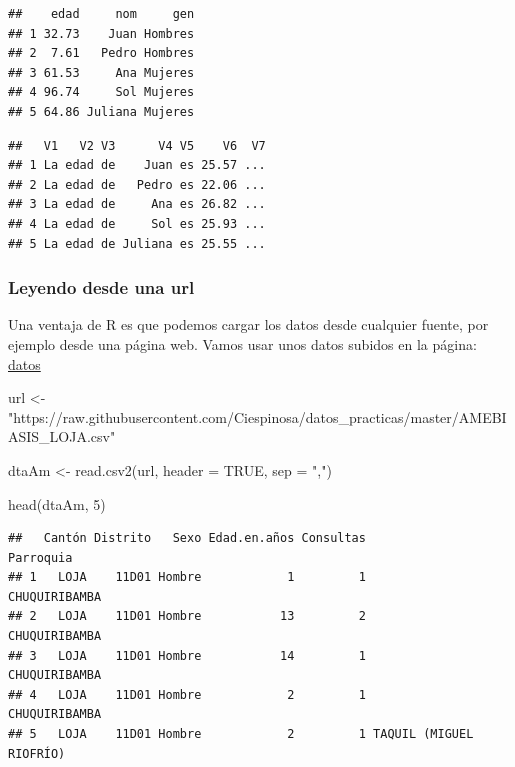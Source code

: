 \documentclass[
]{article}
\newenvironment{Shaded}{\begin{snugshade}}{\end{snugshade}}
\newcommand{\AttributeTok}[1]{\textcolor[rgb]{0.77,0.63,0.00}{#1}}
\newcommand{\ConstantTok}[1]{\textcolor[rgb]{0.00,0.00,0.00}{#1}}
\newcommand{\DecValTok}[1]{\textcolor[rgb]{0.00,0.00,0.81}{#1}}
\newcommand{\FunctionTok}[1]{\textcolor[rgb]{0.00,0.00,0.00}{#1}}
\newcommand{\NormalTok}[1]{#1}
\newcommand{\OtherTok}[1]{\textcolor[rgb]{0.56,0.35,0.01}{#1}}
\newcommand{\StringTok}[1]{\textcolor[rgb]{0.31,0.60,0.02}{#1}}
\begin{document}
\begin{verbatim}
##    edad     nom     gen
## 1 32.73    Juan Hombres
## 2  7.61   Pedro Hombres
## 3 61.53     Ana Mujeres
## 4 96.74     Sol Mujeres
## 5 64.86 Juliana Mujeres
\end{verbatim}

\begin{verbatim}
##   V1   V2 V3      V4 V5    V6  V7
## 1 La edad de    Juan es 25.57 ...
## 2 La edad de   Pedro es 22.06 ...
## 3 La edad de     Ana es 26.82 ...
## 4 La edad de     Sol es 25.93 ...
## 5 La edad de Juliana es 25.55 ...
\end{verbatim}

\hypertarget{leyendo-desde-una-url}{%
\subsubsection{Leyendo desde una url}\label{leyendo-desde-una-url}}

Una ventaja de R es que podemos cargar los datos desde cualquier fuente,
por ejemplo desde una página web. Vamos usar unos datos subidos en la
página:
\href{https://github.com/Ciespinosa/datos_practicas/blob/master/AMEBIASIS_LOJA.csv}{datos}

\begin{Shaded}
\begin{Highlighting}[]
\NormalTok{url }\OtherTok{\textless{}{-}} \StringTok{"https://raw.githubusercontent.com/Ciespinosa/datos\_practicas/master/AMEBIASIS\_LOJA.csv"}

\NormalTok{dtaAm }\OtherTok{\textless{}{-}} \FunctionTok{read.csv2}\NormalTok{(url, }\AttributeTok{header =} \ConstantTok{TRUE}\NormalTok{, }\AttributeTok{sep =} \StringTok{","}\NormalTok{)}

\FunctionTok{head}\NormalTok{(dtaAm, }\DecValTok{5}\NormalTok{)}
\end{Highlighting}
\end{Shaded}

\begin{verbatim}
##   Cantón Distrito   Sexo Edad.en.años Consultas               Parroquia
## 1   LOJA    11D01 Hombre            1         1           CHUQUIRIBAMBA
## 2   LOJA    11D01 Hombre           13         2           CHUQUIRIBAMBA
## 3   LOJA    11D01 Hombre           14         1           CHUQUIRIBAMBA
## 4   LOJA    11D01 Hombre            2         1           CHUQUIRIBAMBA
## 5   LOJA    11D01 Hombre            2         1 TAQUIL (MIGUEL RIOFRÍO)
\end{verbatim}
\end{document}
